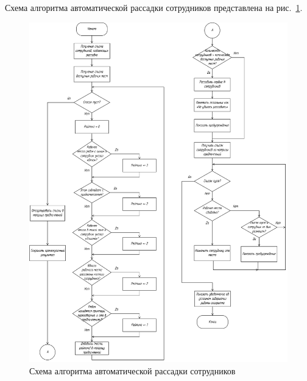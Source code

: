 Схема алгоритма автоматической рассадки сотрудников представлена на рис.~\ref{fig:system-design:algorithms:automatic-workspace-occupation}.

\begin{figure}
\centering
    \includegraphics[width=0.99\linewidth]{assets/algorithm-automatic-workspace-occupation.png}
    \caption{Схема алгоритма автоматической рассадки сотрудников}
    \label{fig:system-design:algorithms:automatic-workspace-occupation}
\end{figure}
